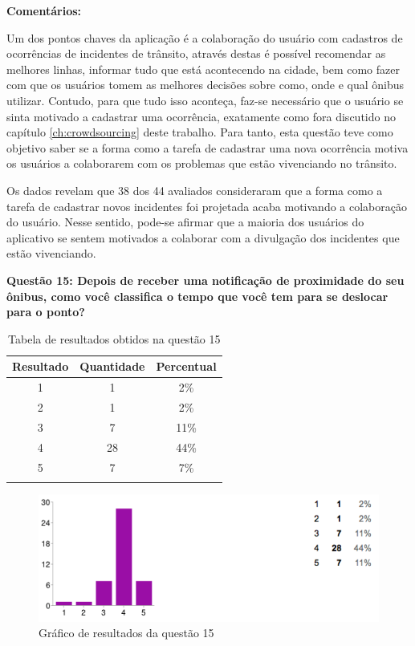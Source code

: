 \textbf{Comentários:}

Um dos pontos chaves da aplicação é a colaboração do usuário com cadastros de ocorrências de incidentes de  trânsito, através destas é possível recomendar as melhores linhas, informar tudo que está acontecendo na cidade, bem como fazer com que os usuários tomem as melhores decisões sobre como, onde e qual ônibus utilizar. Contudo, para que tudo isso aconteça, faz-se necessário que o usuário se sinta motivado a cadastrar uma ocorrência, exatamente como fora discutido no capítulo \ref{ch:crowdsourcing} deste trabalho. Para tanto, esta questão teve como objetivo saber se a forma como a tarefa de cadastrar uma nova ocorrência motiva os usuários a colaborarem com os problemas que estão vivenciando no trânsito.     
	
Os dados revelam que 38 dos 44 avaliados consideraram que a forma como a tarefa de cadastrar novos incidentes foi projetada acaba motivando a colaboração do usuário. Nesse sentido, pode-se afirmar que a maioria dos usuários do aplicativo se sentem motivados a colaborar com a divulgação dos incidentes que estão vivenciando.\newline

\textbf{Questão 15: Depois de receber uma notificação de proximidade do seu ônibus, como você classifica o tempo que você tem para se deslocar para o ponto?}

\begin{center}
\begin{longtable}{c|c|c}
\hline
    \multicolumn{1}{c}{\textbf{Resultado}} & \multicolumn{1}{c}{\textbf{Quantidade}} & \multicolumn{1}{c}{\textbf{Percentual}} \\
\hline
    1 & 1 &  2\%\\
    \hline
    2 & 1 & 2\%\\
    \hline
    3 & 7 &  11\%\\
    \hline
    4 & 28 & 44\%\\
    \hline
    5 & 7 & 7\%\\
    \hline
\caption{Tabela de resultados obtidos na questão 15}
\label{tabq15}
\end{longtable}
\end{center}


\begin{figure}[h]
\begin{center}
  \includegraphics[width=16cm]{images/graficos/questao15.png}
  \caption{Gráfico de resultados da questão 15}
  \label{fig:questao15}
\end{center}
\end{figure}

